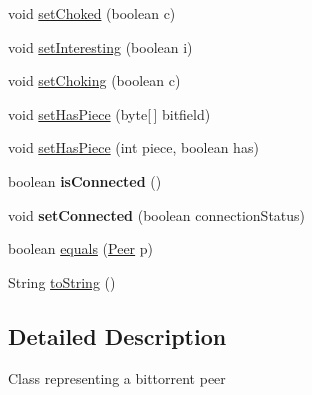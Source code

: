 \begin{DoxyCompactItemize}
\item 
void \hyperlink{classj_bittorrent_a_p_i_1_1_peer_abaafe98ab9364cd5f97bf44845ffe547}{setChoked} (boolean c)
\item 
void \hyperlink{classj_bittorrent_a_p_i_1_1_peer_afd6499773360e27d3c87c3a392014c46}{setInteresting} (boolean i)
\item 
void \hyperlink{classj_bittorrent_a_p_i_1_1_peer_a80ca94e6613a57e26cb8d492f527b655}{setChoking} (boolean c)
\item 
void \hyperlink{classj_bittorrent_a_p_i_1_1_peer_aa21bc505e928ff01a08472e68c2de02d}{setHasPiece} (byte\mbox{[}$\,$\mbox{]} bitfield)
\item 
void \hyperlink{classj_bittorrent_a_p_i_1_1_peer_ab3aed195d88ad4569f531bd64491b000}{setHasPiece} (int piece, boolean has)
\item 
\hypertarget{classj_bittorrent_a_p_i_1_1_peer_a1b1abd159ae2a0f01c68ed3841f95bc2}{
boolean {\bfseries isConnected} ()}
\label{classj_bittorrent_a_p_i_1_1_peer_a1b1abd159ae2a0f01c68ed3841f95bc2}

\item 
\hypertarget{classj_bittorrent_a_p_i_1_1_peer_a4ca2de5db57174693e6685f883fa2c94}{
void {\bfseries setConnected} (boolean connectionStatus)}
\label{classj_bittorrent_a_p_i_1_1_peer_a4ca2de5db57174693e6685f883fa2c94}

\item 
boolean \hyperlink{classj_bittorrent_a_p_i_1_1_peer_a4c9f6cb8896bbb0874a53943fe56d74f}{equals} (\hyperlink{classj_bittorrent_a_p_i_1_1_peer}{Peer} p)
\item 
String \hyperlink{classj_bittorrent_a_p_i_1_1_peer_a29261679f8b9d63f464a2a9c916a6982}{toString} ()
\end{DoxyCompactItemize}


\subsection{Detailed Description}
Class representing a bittorrent peer 

